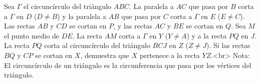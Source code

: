 Sea $\Gamma$ el circuncírculo del triángulo $ABC$. La paralela a $AC$ que pasa por $B$ corta a $\Gamma$ en $D$ ($D \neq B$) y la paralela a $AB$ que pasa por $C$ corta a $\Gamma$ en $E$ ($E \neq C$). Las rectas $AB$ y $CD$ se cortan en $P$, y las rectas $AC$ y $BE$ se cortan en $Q$. Sea $M$ el punto medio de $DE$. La recta $AM$ corta a $\Gamma$ en $Y$ ($Y \neq A$) y a la recta $PQ$ en $J$. La recta $PQ$ corta al circuncírculo del triángulo $BCJ$ en $Z$ ($Z \neq J$). Si las rectas $BQ$ y $CP$ se cortan en $X$, demuestra que $X$ pertenece a la recta $YZ$.<br>
Nota: El circuncírculo de un triángulo es la circunferencia que pasa por los vértices del triángulo.
